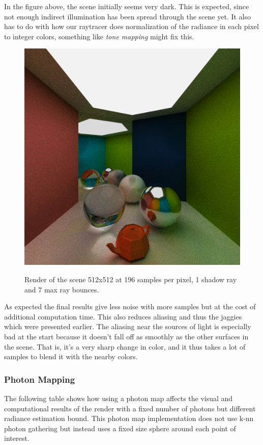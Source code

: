 \documentclass[a4paper, twocolumn]{article}
\begin{document}
            In the figure above, the scene initially seems very dark. This is expected, since not enough indirect illumination has been spread through the scene yet. It also has to do with how our raytracer does normalization of the radiance in each pixel to integer colors, something like \emph{tone mapping} might fix this.

            \begin{figure}[H]
                \centering
                \caption{Render of the scene 512x512 at 196 samples per pixel, 1 shadow ray and 7 max ray bounces.}
                \includegraphics[width=0.8\linewidth]{share/results/supersamples_196.png}
                \label{fig:supersamples_192}
            \end{figure}

            As expected the final results give less noise with more samples but at the cost of additional computation time. This also reduces aliasing and thus the jaggies which were presented earlier. The aliasing near the sources of light is especially bad at the start because it doesn't fall off as smoothly as the other surfaces in the scene. That is, it's a very sharp change in color, and it thus takes a lot of samples to blend it with the nearby colors.

            \subsubsection*{Photon Mapping}

            The following table shows how using a photon map affects the visual and computational results of the render with a fixed number of photons but different radiance estimation bound. This photon map implementation does not use k-nn photon gathering but instead uses a fixed size sphere around each  point of interest.
\end{document}
